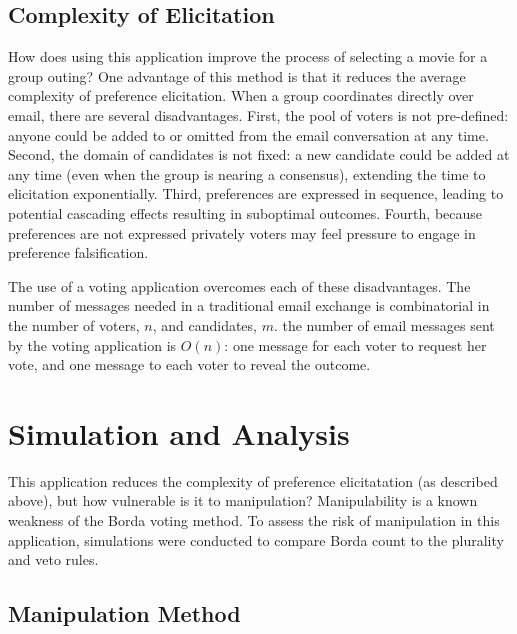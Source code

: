 \documentclass[12pt,letterpaper]{article} %
\begin{document}
\subsection{Complexity of Elicitation}

How does using this application improve the process of selecting a movie for a group outing? One advantage of this method is that it reduces the average complexity of preference elicitation. When a group coordinates directly over email, there are several disadvantages. First, the pool of voters is not pre-defined: anyone could be added to or omitted from the email conversation at any time. Second, the domain of candidates is not fixed: a new candidate could be added at any time (even when the group is nearing a consensus), extending the time to elicitation exponentially. Third, preferences are expressed in sequence, leading to potential cascading effects resulting in suboptimal outcomes. Fourth, because preferences are not expressed privately voters may feel pressure to engage in preference falsification.

The use of a voting application overcomes each of these disadvantages. The number of messages needed in a traditional email exchange is combinatorial in the number of voters, $n$, and candidates, $m$. the number of email messages sent by the voting application is $O(n)$: one message for each voter to request her vote, and one message to each voter to reveal the outcome.


\section{Simulation and Analysis}

This application reduces the complexity of preference elicitatation (as described above), but how vulnerable is it to manipulation? Manipulability is a known weakness of the Borda voting method. To assess the risk of manipulation in this application, simulations were conducted to compare Borda count to the plurality and veto rules. 

\subsection{Manipulation Method}
\end{document}
